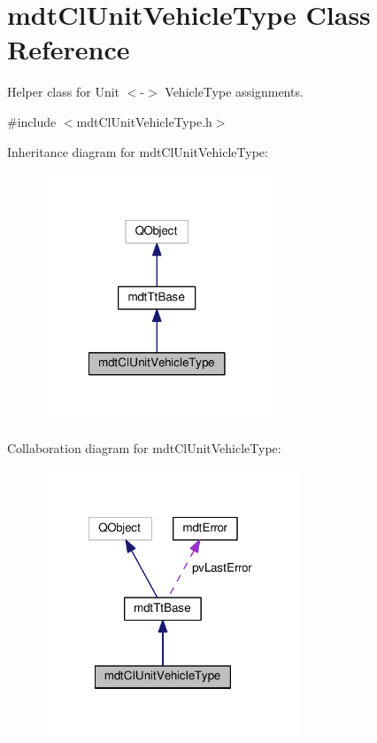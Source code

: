 \hypertarget{classmdt_cl_unit_vehicle_type}{\section{mdt\-Cl\-Unit\-Vehicle\-Type Class Reference}
\label{classmdt_cl_unit_vehicle_type}
}


Helper class for Unit $<$-\/$>$ Vehicle\-Type assignments.  




{\ttfamily \#include $<$mdt\-Cl\-Unit\-Vehicle\-Type.\-h$>$}



Inheritance diagram for mdt\-Cl\-Unit\-Vehicle\-Type\-:
\nopagebreak
\begin{figure}[H]
\begin{center}
\leavevmode
\includegraphics[width=194pt]{classmdt_cl_unit_vehicle_type__inherit__graph}
\end{center}
\end{figure}


Collaboration diagram for mdt\-Cl\-Unit\-Vehicle\-Type\-:
\nopagebreak
\begin{figure}[H]
\begin{center}
\leavevmode
\includegraphics[width=218pt]{classmdt_cl_unit_vehicle_type__coll__graph}
\end{center}
\end{figure}
